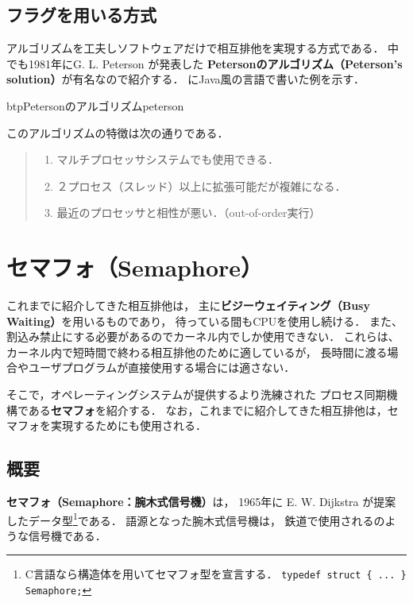 \subsection{フラグを用いる方式}
アルゴリズムを工夫しソフトウェアだけで相互排他を実現する方式である．
中でも1981年にG. L. Peterson が発表した
{\bf Petersonのアルゴリズム（Peterson's solution）}が有名なので紹介する．
にJava風の言語で書いた例を示す．

\begin{myfig}{btp}{Petersonのアルゴリズム}{peterson}

\end{myfig}

このアルゴリズムの特徴は次の通りである．

\begin{quote}
\begin{enumerate}
\item マルチプロセッサシステムでも使用できる．
\item ２プロセス（スレッド）以上に拡張可能だが複雑になる．
\item 最近のプロセッサと相性が悪い．（out-of-order実行）
\end{enumerate}
\end{quote}

\section{セマフォ（Semaphore）}
これまでに紹介してきた相互排他は，
主に{\bf ビジーウェイティング（Busy Waiting）}を用いるものであり，
待っている間もCPUを使用し続ける．
また、割込み禁止にする必要があるのでカーネル内でしか使用できない．
これらは、カーネル内で短時間で終わる相互排他のために適しているが，
長時間に渡る場合やユーザプログラムが直接使用する場合には適さない．

そこで，オペレーティングシステムが提供するより洗練された
プロセス同期機構である{\bf セマフォ}を紹介する．
なお，これまでに紹介してきた相互排他は，セマフォを実現するためにも使用される．

\subsection{概要}
{\bf セマフォ（Semaphore：腕木式信号機）}は，
1965年に E. W. Dijkstra が提案したデータ型\footnote{
C言語なら構造体を用いてセマフォ型を宣言する．
{\tt typedef struct \{ ... \} Semaphore;}
}である．
語源となった腕木式信号機は，
鉄道で使用されるのような信号機である．

